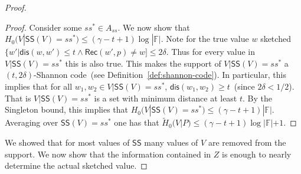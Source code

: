 \documentclass[11pt]{article}
\newcommand{\defref}[1]{\mbox{Definition~\ref{#1}}}
\newcommand{\class}[1]{{\ensuremath{\mathsf{#1}}}}
\newcommand{\sketch}{\ensuremath{\class{SS}}\xspace}
\newcommand{\rec}{\ensuremath{\class{Rec}}\xspace}
\newcommand{\dis}{\ensuremath{\mathsf{dis}}}
\begin{document}
\begin{proof}
\begin{proof}
Consider some $ss^*\in A_{ss}$.  We now show that $H_0(V | \sketch(V) = ss^*) \le (\gamma-t+1)\log |\mathbb{F}|$.  Note for the true value $w$ sketched $\{w' | \dis(w, w') \le t \wedge \rec(w', p) \neq w] \le 2\delta$.  Thus for every value in $V|\sketch(V) = ss^*$ this is also true.  This makes the support of $V|\sketch(V)=ss^*$ a $(t, 2\delta)$-Shannon code~(see \defref{def:shannon-code}).  In particular, this implies that for all $w_1, w_2 \in V|\sketch(V)=ss^*$, $\dis(w_1, w_2)\ge t$~(since $2\delta< 1/2$).  That is $V|\sketch(V)=ss^*$ is a set with minimum distance at least $t$.  By the Singleton bound, this implies that $H_0(V |\sketch(V)=ss^*) \le (\gamma -t+1 )|\mathbb{F}|$.  Averaging over $\sketch(V)=ss^*$ one has that $\tilde{H}_0(V|P) \le (\gamma -t +1) \log|\mathbb{F}| +1$.
%
\end{proof}
We showed that for most values of $\sketch$ many values of $V$ are removed from the support.  We now show that the information contained in $Z$ is enough to nearly determine the actual sketched value.


\end{proof}
\end{document}
